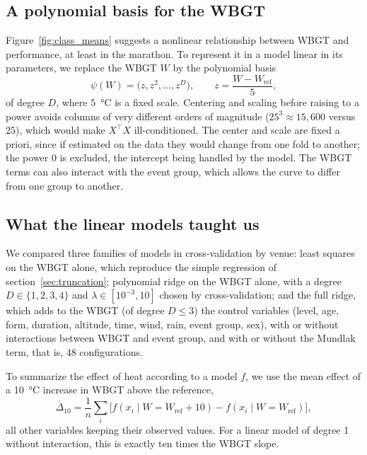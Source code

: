 \documentclass[11pt,a4paper]{article}
\begin{document}
\subsection{A polynomial basis for the WBGT}\label{sec:polynomial}

Figure~\ref{fig:class_means} suggests a nonlinear relationship between WBGT and performance, at least in the
marathon. To represent it in a model linear in its parameters, we replace the WBGT $W$ by the polynomial basis
\[
\psi(W) = \big(z, z^2, \dots, z^D\big), \qquad z = \frac{W - W_{\text{ref}}}{5},
\]
of degree $D$, where $5$~°C is a fixed scale. Centering and scaling before raising to a power avoids columns of very
different orders of magnitude ($25^3 \approx 15{,}600$ versus $25$), which would make $X^\top X$ ill-conditioned. The
center and scale are fixed a priori, since if estimated on the data they would change from one fold to another; the
power 0 is excluded, the intercept being handled by the model. The WBGT terms can also interact with the event group,
which allows the curve to differ from one group to another.

\subsection{What the linear models taught us}\label{sec:linear_results}

We compared three families of models in cross-validation by venue: least squares on the WBGT alone, which reproduce
the simple regression of section~\ref{sec:truncation}; polynomial ridge on the WBGT alone, with a degree
$D \in \{1, 2, 3, 4\}$ and $\lambda \in [10^{-3}, 10]$ chosen by cross-validation; and the full ridge, which adds to the
WBGT (of degree $D \le 3$) the control variables (level, age, form, duration, altitude, time, wind, rain, event group,
sex), with or without interactions between WBGT and event group, and with or without the Mundlak term, that is, 48
configurations.

To summarize the effect of heat according to a model $f$, we use the mean effect of a 10~°C increase in WBGT above the
reference,
\[
\overline{\Delta}_{10} = \frac1n \sum_i \Big[ f(x_i \mid W = W_{\text{ref}} + 10) - f(x_i \mid W = W_{\text{ref}}) \Big],
\]
all other variables keeping their observed values. For a linear model of degree 1 without interaction, this is exactly
ten times the WBGT slope.
\end{document}
